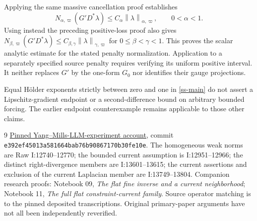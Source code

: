 \documentclass[11pt]{article}
\theoremstyle{remark}
\newcommand{\norm}[1]{\left\|#1\right\|}
\begin{document}
Applying the same massive cancellation proof establishes
\begin{equation}\label{ss-scalar-right-divergence}
 N_{\alpha,\varpi}(G'D^*\lambda)
       \le C_\alpha\norm{\lambda}_{\alpha,\varpi},
                       \qquad0<\alpha<1.
\end{equation}
Using instead the preceding positive-loss proof also gives
$N_{\beta,\varpi}(G'D^*\lambda)
\le C_{\beta,\gamma}\norm{\lambda}_{\gamma,\varpi}$ for
$0\le\beta<\gamma<1$. This proves the scalar analytic estimate
for the stated penalty normalization. Application to a separately
specified source penalty requires verifying its uniform positive
interval. It neither replaces $G'$ by the one-form $G_0$ nor
identifies their gauge projections.

Equal H\"older exponents strictly between zero and one in
\eqref{ss-main} do not assert a Lipschitz-gradient endpoint or a
second-difference bound on arbitrary bounded forcing. The earlier
endpoint counterexample remains applicable to those other claims.

\begin{thebibliography}{9}
\href{https://github.com/ethanwsussman/Yang--Mills-LLM-experiment/tree/e392ef45013a581664bab76b90867170b30fe10e}
{Pinned Yang--Mills-LLM-experiment account}, commit
\texttt{e392ef45013a581664bab76b90867170b30fe10e}.
The homogeneous weak norms are Raw I:12740--12770; the bounded
current assumption is I:12951--12966; the distinct right-divergence
members are I:13601--13615; the current assertions and exclusion of
the current Laplacian member are I:13749--13804.
Companion research proofs: Notebook 09, \emph{The flat fine inverse
and a current neighborhood}; Notebook 11, \emph{The full flat
constraint-current family}. Source operator matching is to the pinned
deposited transcriptions. Original primary-paper arguments have not
all been independently reverified.
\end{thebibliography}
\end{document}
